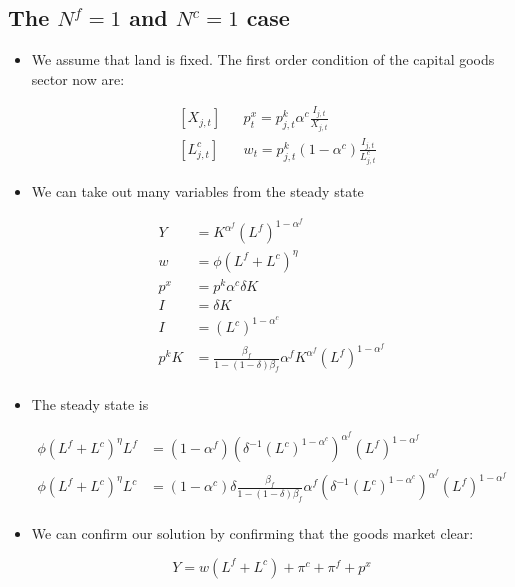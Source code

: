 \documentclass[11pt]{article}
\numberwithin{equation}{section}
\begin{document}
\subsection{The $N^f=1$ and $N^c=1$ case}



\begin{itemize}
	
	
	
	\item We assume that land is fixed. The first order condition of the capital goods sector now are:

	\begin{align}
	& \left[X_{j,t}\right]
	&&
	p^x_{t} = p^k_{j,t} \alpha^c \frac{I_{j,t}}{X_{j,t}}
	\\
	& \left[L^c_{j,t}\right]
	&&
	w_t = p^k_{j,t} (1-\alpha^c) \frac{I_{j,t}}{L^c_{j,t}}
	\end{align}
	
	
	\item We can take out many variables from the steady state 
	
		\begin{align*}
		Y & =  	K^{\alpha^f} \left(L^f\right)^{1-\alpha^f} \\
		w  & = \phi \left(L^f+L^c\right)^{\eta}\\
		p^x & = p^k  \alpha^c \delta K  \\
		I & = \delta K\\
		I & = \left(L^c\right)^{1-\alpha^c}\\
	p^k K & =\frac{\beta_f}{1-(1-\delta)\beta_f}  \alpha^f K^{\alpha^f} \left(L^f\right)^{1-\alpha^f}  \\ 
	\end{align*}
	
	\item The steady state is
	
		
	\begin{align*}
	\phi \left(L^f+L^c\right)^{\eta} L^f  & =  (1-\alpha^f) \left(\delta^{-1}\left(L^c\right)^{1-\alpha^c}\right)^{\alpha^f} \left(L^f\right)^{1-\alpha^f}  \\
	\phi \left(L^f+L^c\right)^{\eta} L^c  & =  (1-\alpha^c)\delta \frac{\beta_f}{1-(1-\delta)\beta_f}  \alpha^f  \left(\delta^{-1}\left(L^c\right)^{1-\alpha^c}\right)^{\alpha^f} \left(L^f\right)^{1-\alpha^f} \\
	\end{align*}
	
	\item We can confirm our solution by confirming that the goods market clear:
	
	  $$Y  =  w \left(L^f+L^c\right) + \pi^c + \pi^f +p^x $$
\end{itemize}
\end{document}
